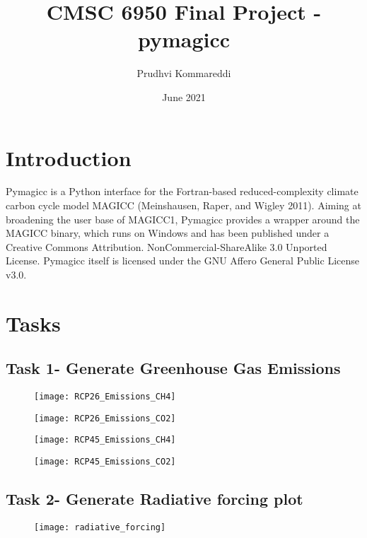 \documentclass{article}
\title{CMSC 6950 Final Project - pymagicc}
\author{Prudhvi Kommareddi}
\date{June 2021}
\begin{document}
\maketitle

\section{Introduction}
Pymagicc\cite{Gieseke2018} is a Python interface for the Fortran-based reduced-complexity climate carbon cycle model MAGICC (Meinshausen, Raper, and Wigley 2011). Aiming at broadening the user base of MAGICC1, Pymagicc provides a wrapper around the MAGICC binary, which runs on Windows and has been published under a Creative Commons Attribution. NonCommercial-ShareAlike 3.0 Unported License. Pymagicc itself is licensed under the GNU Affero General Public License v3.0.

\section{Tasks}

\subsection{Task 1- Generate Greenhouse Gas Emissions}

\begin{figure}[h]
    \texttt{[image: RCP26\_Emissions\_CH4]}
\end{figure}

\begin{figure}
    \texttt{[image: RCP26\_Emissions\_CO2]}
\end{figure}

\begin{figure}
    \texttt{[image: RCP45\_Emissions\_CH4]}
\end{figure}

\begin{figure}
    \texttt{[image: RCP45\_Emissions\_CO2]}
\end{figure}

\clearpage
\subsection{Task 2- Generate Radiative forcing plot}

\begin{figure}[h]
\texttt{[image: radiative\_forcing]}
\end{figure}



\end{document}
